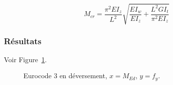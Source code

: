 \documentclass{report}
\begin{document}
\begin{dmath}
    M_{cr}=\frac{\pi^2 EI_z}{L^2}\sqrt{\frac{EI_w}{EI_z}+\frac{L^2GI_t}{\pi^2EI_z}}
\end{dmath}

\subsubsection{Résultats}
Voir Figure~\ref{fig:m1}.

\begin{figure}[!ht]
    \centering
    
    \caption{Eurocode 3 en déversement, $x=M_{Ed}$, $y=f_y$.}\label{fig:m1}
\end{figure}

\listoffigures

\nocite{*}
\printbibliography
\end{document}
